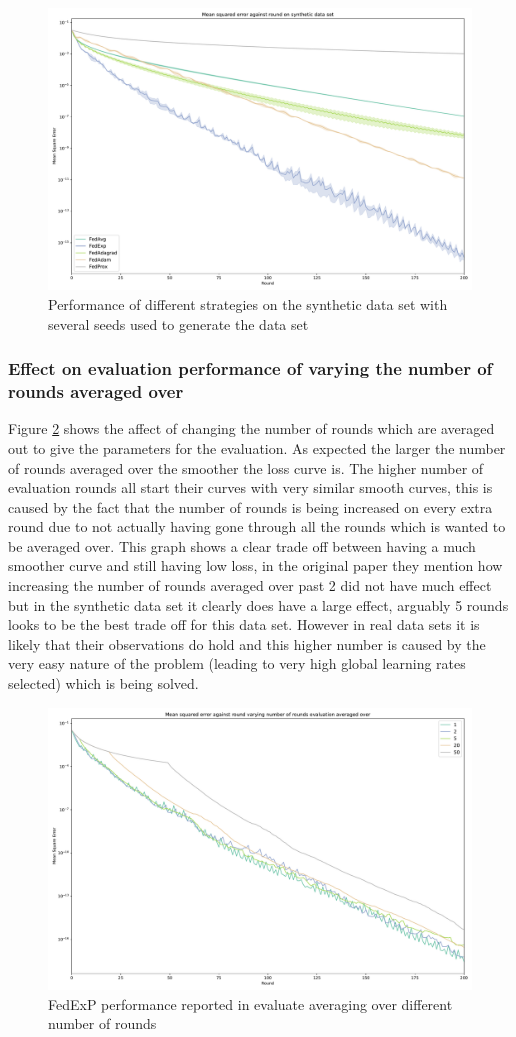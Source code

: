 \documentclass{article}
\begin{document}
\begin{figure}
    \centerline{\includegraphics[width=.6\linewidth]{figs/synthetic_200Rounds_ManySeeds.pdf}}
    \caption{Performance of different strategies on the synthetic data set with several seeds used to generate the data set}
    \label{fig:200RoundsSeed42}
\end{figure}


\subsubsection{Effect on evaluation performance of varying the number of rounds averaged over}

Figure \ref{fig:differentNumberOfAverageEvaluateRoundsSynthetic} shows the affect of changing the number of rounds which are averaged out to give the parameters for the evaluation.  As expected the larger the number of rounds averaged over the smoother the loss curve is.  The higher number of evaluation rounds all start their curves with very similar smooth curves, this is caused by the fact that the number of rounds is being increased on every extra round due to not actually having gone through all the rounds which is wanted to be averaged over.  This graph shows a clear trade off between having a much smoother curve and still having low loss, in the original paper they mention how increasing the number of rounds averaged over past 2 did not have much effect but in the synthetic data set it clearly does have a large effect, arguably 5 rounds looks to be the best trade off for this data set.  However in real data sets it is likely that their observations do hold and this higher number is caused by the very easy nature of the problem (leading to very high global learning rates selected) which is being solved. 

\begin{figure}
    \centerline{\includegraphics[width=.6\linewidth]{figs/synthetic_numberOfRoundsAverageEvaluate.pdf}}
    \caption{FedExP performance reported in evaluate averaging over different number of rounds}
    \label{fig:differentNumberOfAverageEvaluateRoundsSynthetic}
\end{figure}
\end{document}
